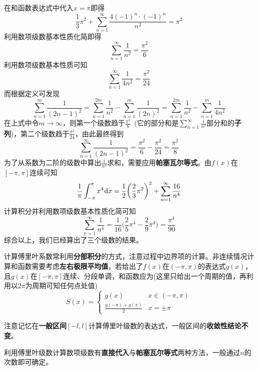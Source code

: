 \documentclass[a4paper,UTF8,fontset=windows,AutoFakeBold]{ctexart}
\newcommand*{\dr}{\hspace{0.07em}\mathrm{d}}
\newcommand*{\suminf}[1][n=1]{\sum_{#1}^\infty}
\newcommand*{\note}{\noindent *}
\theoremstyle{ex}
\begin{document}
\begin{framed}
{\begin{itemize}
        在和函数表达式中代入$x=\pi$即得
        $$\frac{1}{3}\pi^2+\suminf\frac{4(-1)^n\cdot(-1)^n}{n^2}=\pi^2$$
        利用数项级数基本性质化简即得
        $$\suminf\frac{1}{n^2}=\frac{\pi^2}{6}$$
        利用数项级数基本性质可知
        $$\suminf\frac{1}{4n^2}=\frac{\pi^2}{24}$$
        而根据定义可发现
        $$\sum_{n=1}^m\frac{1}{(2n-1)^2}=\sum_{n=1}^{2m}\frac{1}{n^2}-\sum_{n=1}^m\frac{1}{(2n)^2}=\sum_{n=1}^{2m}\frac{1}{n^2}-\sum_{n=1}^m\frac{1}{4n^2}$$
        在上式中令$m\to\infty$，则第一个级数趋于$\frac{\pi^2}{6}$\ (它的部分和是$\suminf\frac{1}{n^2}$部分和的\textbf{子列})，第二个级数趋于$\frac{\pi^2}{24}$，由此最终得到
        $$\suminf\frac{1}{(2n-1)^2}=\frac{\pi^2}{6}-\frac{\pi^2}{24}=\frac{\pi^2}{8}$$
        为了从系数为二阶的级数中算出$\frac{1}{n^4}$求和，需要应用\textbf{帕塞瓦尔等式}。由$f(x)$在$[-\pi,\pi]$连续可知
        $$\frac{1}{\pi}\int_{-\pi}^\pi x^4\dr x=\frac{1}{2}\bigg(\frac{2}{3}\pi^2\bigg)^2+\suminf\frac{16}{n^4}$$
        计算积分并利用数项级数基本性质化简可知
        $$\suminf\frac{1}{n^4}=\frac{1}{16}\bigg(\frac{2}{5}\pi^4-\frac{2}{9}\pi^4\bigg)=\frac{\pi^4}{90}$$
        综合以上，我们已经算出了三个级数的结果。
    \end{itemize}
}
\end{framed}

\note 计算傅里叶系数常利用\textbf{分部积分}的方式，注意过程中边界项的计算。非连续情况计算和函数需要考虑\textbf{左右极限平均值}，若给出了$f(x)$在$(-\pi,\pi)$的表达式$g(x)$，且$g(x)$在$[-\pi,\pi]$连续、分段单调，和函数应为(这里只给出一个周期的值，再利用以$2\pi$为周期可知任何点处值)
$$S(x)=\begin{cases}g(x)&x\in(-\pi,\pi)\\\frac{g(-\pi)+g(\pi)}{2}&x=\pm\pi\end{cases}$$

\note 注意记忆在\textbf{一般区间}$[-l,l]$计算傅里叶级数的表达式，一般区间的\textbf{收敛性结论不变}。

\note 利用傅里叶级数计算数项级数有\textbf{直接代入}与\textbf{帕塞瓦尔等式}两种方法，一般通过$n$的次数即可确定。
\end{document}
